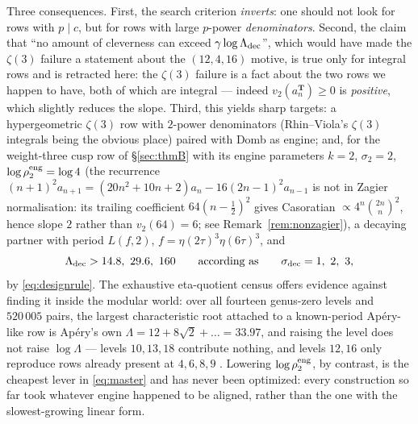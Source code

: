 Three consequences.  First, the search criterion \emph{inverts}: one should not
look for rows with $p\mid c$, but for rows with large $p$-power
\emph{denominators}.  Second, the claim that ``no amount of cleverness can
exceed $\gamma\log\Lambda_{\rm dec}$'', which would have made the $\zeta(3)$
failure a statement about the $(12,4,16)$ motive, is true only for integral
rows and is retracted here: the $\zeta(3)$ failure is a fact about the two rows
we happen to have, both of which are integral --- indeed
$v_2(a^{\mathbf T}_n)\ge0$ is \emph{positive}, which slightly reduces the
slope.  Third, this yields sharp targets: a hypergeometric $\zeta(3)$ row with
$2$-power denominators (Rhin--Viola's $\zeta(3)$ integrals being the obvious
place) paired with Domb as engine; and, for the weight-three cusp row of
\S\ref{sec:thmB} with its engine parameters
$k=2$, $\sigma_2=2$, $\log\rho_2^{\rm eng}=\log4$ (the recurrence
$(n+1)^2a_{n+1}=(20n^2+10n+2)a_n-16(2n-1)^2a_{n-1}$ is not in Zagier
normalisation: its trailing coefficient $64(n-\tfrac12)^2$ gives Casoratian
$\propto4^n\binom{2n}{n}^2$, hence slope $2$ rather than $v_2(64)=6$; see
Remark~\ref{rem:nonzagier}), a decaying partner with
period $L(f,2)$, $f=\eta(2\tau)^3\eta(6\tau)^3$, and
\[
\Lambda_{\rm dec}>14.8,\ 29.6,\ 160
\qquad\text{according as}\qquad
\sigma_{\rm dec}=1,\ 2,\ 3 ,
\]
by \eqref{eq:designrule}.  The exhaustive eta-quotient census offers evidence
against finding it inside the modular world: over all fourteen genus-zero
levels and $520\,005$ pairs, the largest characteristic root attached to a
known-period Ap\'ery-like row is Ap\'ery's own $\Lambda=12+8\sqrt2+\dots=33.97$,
and raising the level does not raise $\log\Lambda$ --- levels $10,13,18$
contribute nothing, and levels $12,16$ only reproduce rows already present at
$4,6,8,9$ \cite{ProjSporadicSearch}.  Lowering $\log\rho_2^{\rm eng}$, by
contrast, is the cheapest lever in \eqref{eq:master} and has never been
optimized: every construction so far took whatever engine happened to be
aligned, rather than the one with the slowest-growing linear form.
